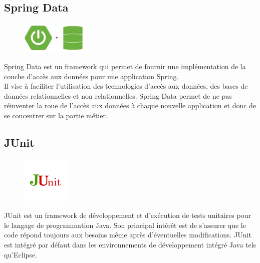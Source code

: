 \subsection{Spring Data}
\begin{figure}[h!]  
 \centering
    \includegraphics[width=0.3\textwidth]{chapitre3/Figures/data.png}
\end{figure}
Spring Data est un framework qui permet de fournir une implémentation de la couche d’accès aux données pour une application Spring. \\
Il vise à faciliter l’utilisation des technologies d’accès aux données, des bases de données relationnelles et non relationnelles. Spring Data permet de ne pas réinventer la roue de l’accès aux données à chaque nouvelle application et donc de se concentrer sur la partie métier.


\subsection{JUnit}
\begin{figure}[h!]  
 \centering
    \includegraphics[width=0.2\textwidth]{chapitre3/Figures/junit.png}
\end{figure}
JUnit est un framework de développement et d'exécution de tests unitaires pour le langage de programmation Java. Son principal intérêt est de s'assurer que le code répond toujours aux besoins même après d'éventuelles modifications. 
JUnit est intégré par défaut dans les environnements de développement intégré Java tels qu’Eclipse.
